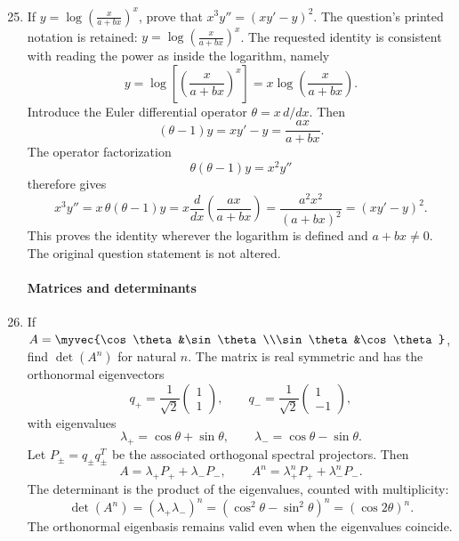 \begin{enumerate}[label=\theenumi,leftmargin=4mm,itemsep=9pt]
\setcounter{enumi}{24}\item If $y=\log\left(\frac{x}{a+bx}\right)^x$, prove that $x^3y''=(xy'-y)^2$.
\solution The question's printed notation is retained:
\(y=\log\left(\frac{x}{a+bx}\right)^x\). The requested identity is
consistent with reading the power as inside the logarithm, namely
\[
y=\log\left[\left(\frac{x}{a+bx}\right)^x\right]
=x\log\left(\frac{x}{a+bx}\right).
\]
Introduce the Euler differential operator \(\theta=x\,d/dx\).
Then
\[
(\theta-1)y=xy'-y=\frac{ax}{a+bx}.
\]
The operator factorization
\[
\theta(\theta-1)y=x^2y''
\]
therefore gives
\[
x^3y''=x\,\theta(\theta-1)y
=x\frac{d}{dx}\left(\frac{ax}{a+bx}\right)
=\frac{a^2x^2}{(a+bx)^2}
=(xy'-y)^2.
\]
This proves the identity wherever the logarithm is defined and
\(a+bx\ne0\). The original question statement is not altered.

\paragraph*{Matrices and determinants}
\setcounter{enumi}{27}\item If $A=\myvec{\cos\theta&\sin\theta\\\sin\theta&\cos\theta}$, find $\det(A^n)$ for natural $n$.
\solution The matrix is real symmetric and has the orthonormal eigenvectors
\[
q_+=\frac1{\sqrt2}\begin{pmatrix}1\\1\end{pmatrix},
\qquad
q_-=\frac1{\sqrt2}\begin{pmatrix}1\\-1\end{pmatrix},
\]
with eigenvalues
\[
\lambda_+=\cos\theta+\sin\theta,\qquad
\lambda_-=\cos\theta-\sin\theta.
\]
Let \(P_\pm=q_\pm q_\pm^T\) be the associated orthogonal spectral
projectors. Then
\[
A=\lambda_+P_++\lambda_-P_-,
\qquad
A^n=\lambda_+^nP_++\lambda_-^nP_-.
\]
The determinant is the product of the eigenvalues, counted with
multiplicity:
\[
\det(A^n)=(\lambda_+\lambda_-)^n
=(\cos^2\theta-\sin^2\theta)^n
=\boxed{(\cos2\theta)^n}.
\]
The orthonormal eigenbasis remains valid even when the eigenvalues
coincide.


\end{enumerate}
